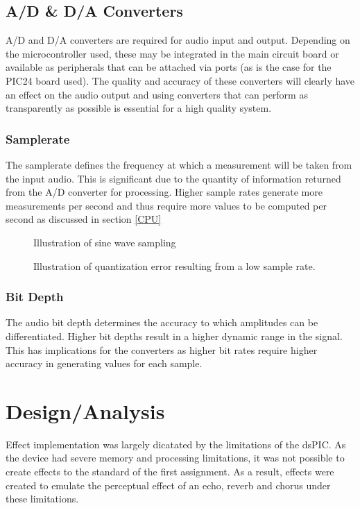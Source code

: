 \documentclass[titlepage]{scrartcl}
\begin{document}
    \subsection{A/D \& D/A Converters}
    A/D and D/A converters are required for audio input and output. Depending
    on the microcontroller used, these may be integrated in the main circuit
    board or available as peripherals that can be attached via ports (as is the
    case for the PIC24 board used). The quality and accuracy of these
    converters will clearly have an effect on the audio output and using
    converters that can perform as transparently as possible is essential for a
    high quality system.~\parencite[p.147-152]{kadis2012sosr}
    
    \subsubsection{Samplerate}
    The samplerate defines the frequency at which a measurement will be taken
    from the input audio. This is significant due to the quantity of
    information returned from the A/D converter for processing. Higher sample
    rates generate more measurements per second and thus require more values
    to be computed per second as discussed in section \ref{CPU}
    \begin{figure}[H]
        \caption{Illustration of sine wave sampling~\parencite[p.140]{kadis2012sosr}}
    \end{figure}
    \begin{figure}[H]
        \caption{Illustration of quantization error resulting from a low sample
        rate.~\parencite[p.146]{kadis2012sosr}}
    \end{figure}

    \subsubsection{Bit Depth}
    The audio bit depth determines the accuracy to which amplitudes can be
    differentiated. Higher bit depths result in a higher dynamic range in the
    signal. This has implications for the converters as higher bit rates
    require higher accuracy in generating values for each sample.~\parencite[p.143-145]{kadis2012sosr}

    \section{Design/Analysis}\label{design}
    Effect implementation was largely dicatated by the limitations of the
    dsPIC. As the device had severe memory and processing limitations, it was
    not possible to create effects to the standard of the first assignment. As
    a result, effects were created to emulate the perceptual effect of an echo,
    reverb and chorus under these limitations.
\end{document}

